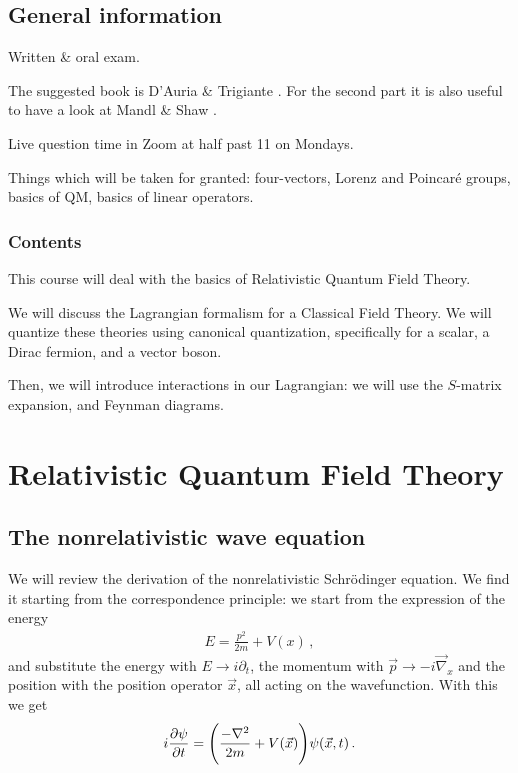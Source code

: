 \documentclass[main.tex]{subfiles}
\begin{document}

\section*{General information}

Written \& oral exam. 


The suggested book is D'Auria \& Trigiante \cite{dauriaSpecialRelativityFeynman2011}. 
For the second part it is also useful to have a look at Mandl \& Shaw \cite{mandlQuantumFieldTheory2010}.


Live question time in Zoom at half past 11 on Mondays. 

Things which will be taken for granted: four-vectors, Lorenz and Poincaré groups, basics of QM, basics of linear operators. 

\subsection*{Contents}

This course will deal with the basics of Relativistic Quantum Field Theory. 

We will discuss the Lagrangian formalism for a Classical Field Theory. 
We will quantize these theories using canonical quantization, specifically for a scalar, a Dirac fermion, and a vector boson. 

Then, we will introduce interactions in our Lagrangian: we will use the \(S\)-matrix expansion, and Feynman diagrams. 

\chapter{Relativistic Quantum Field Theory}

\section{The nonrelativistic wave equation}

We will review the derivation of the nonrelativistic Schrödinger equation. 
We find it starting from the correspondence principle: we start from the expression of the energy 
%
\begin{align}
E = \frac{p^2}{2m} + V(x)
\,,
\end{align}
%
and substitute the energy with \(E \rightarrow i \partial_{t}\), the momentum with \(\vec{p} \rightarrow - i \vec{\nabla}_{x}\) and the position with the position operator \(\vec{x}\), all acting on the wavefunction.
With this we get 
%
\begin{align}
i \pdv{\psi }{t} (\vec{x}, t)
= \qty(\frac{-\nabla^2 }{2m}+  V(\vec{x})) \psi (\vec{x}, t) 
\,.
\end{align}
%
\end{document}
